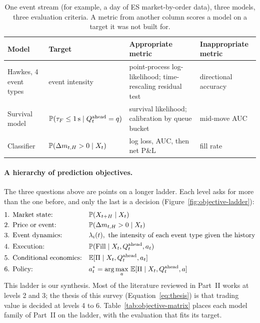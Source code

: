 \begin{table}[!htbp]
\centering\small
\caption{One event stream (for example, a day of ES market-by-order data), three models, three evaluation
criteria. A metric from another column scores a model on a target it was not built for.}
\label{tab:three-problems}
\begin{tabularx}{\linewidth}{lXXX}
\toprule
Model & Target & Appropriate metric & Inappropriate metric \\
\midrule
Hawkes, 4 event types & event intensity & point-process log-likelihood; time-rescaling residual test & directional accuracy \\
Survival model & $\P(\tau_F \le 1\,\mathrm{s} \mid Q^{\text{ahead}}_t = q)$ & survival likelihood; calibration by queue bucket & mid-move AUC \\
Classifier & $\P(\Delta m_{t,H} > 0 \mid X_t)$ & log loss, AUC, then net P\&L & fill rate \\
\bottomrule
\end{tabularx}
\end{table}

\paragraph{A hierarchy of prediction objectives.} The three questions above are points on a longer ladder. Each
level asks for more than the one before, and only the last is a decision (Figure~\ref{fig:objective-ladder}):
\begin{align*}
  &\text{1. Market state:} && \P(X_{t+H} \mid X_t) \\
  &\text{2. Price or event:} && \P(\Delta m_{t,H} > 0 \mid X_t) \\
  &\text{3. Event dynamics:} && \lambda_i(t), \text{ the intensity of each event type given the history} \\
  &\text{4. Execution:} && \P(\Fill \mid X_t, Q^{\text{ahead}}_t, a_t) \\
  &\text{5. Conditional economics:} && \E[\Pi \mid X_t, Q^{\text{ahead}}_t, a_t] \\
  &\text{6. Policy:} && a^*_t = \arg\max_{a}\, \E[\Pi \mid X_t, Q^{\text{ahead}}_t, a]
\end{align*}
This ladder is our synthesis. Most of the literature reviewed in Part~II works at levels 2 and 3; the thesis of this
survey (Equation~\eqref{eq:thesis}) is that trading value is decided at levels 4 to 6. Table~\ref{tab:objective-matrix}
places each model family of Part~II on the ladder, with the evaluation that fits its target.

